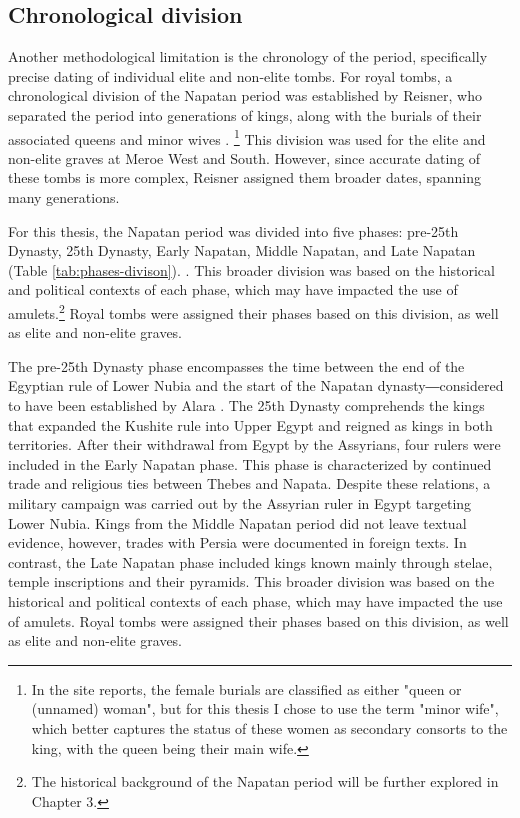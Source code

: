 \subsection{Chronological division}


Another methodological limitation is the chronology of the period, specifically precise dating of individual elite and non-elite tombs. For royal tombs, a chronological division of the Napatan period was established by Reisner, who separated the period into generations of kings, along with the burials of their associated queens and minor wives \parencites{dunhamElKurru1950, dunhamNuri1955}. \footnote{In the site reports, the female burials are classified as either "queen or (unnamed) woman", but for this thesis I chose to use the term "minor wife", which better captures the status of these women as secondary consorts to the king, with the queen being their main wife.} This division was used for the elite and non-elite graves at Meroe West and South. However, since accurate dating of these tombs is more complex, Reisner assigned them broader dates, spanning many generations.


For this thesis, the Napatan period was divided into five phases: pre-25th Dynasty, 25th Dynasty, Early Napatan, Middle Napatan, and Late Napatan (Table \ref{tab:phases-divison}). . This broader division was based on the historical and political contexts of each phase, which may have impacted the use of amulets.\footnote{The historical background of the Napatan period will be further explored in Chapter 3.} Royal tombs were assigned their phases based on this division, as well as elite and non-elite graves.


The pre-25th Dynasty phase encompasses the time between the end of the Egyptian rule of Lower Nubia and the start of the Napatan dynasty―considered to have been established by Alara \parencites[p.~314-318]{törökTwoWorldsFrontier2009}. The 25th Dynasty comprehends the kings that expanded the Kushite rule into Upper Egypt and reigned as kings in both territories. After their withdrawal from Egypt by the Assyrians, four rulers were included in the Early Napatan phase. This phase is characterized by continued trade and religious ties between Thebes and Napata. Despite these relations, a military campaign was carried out by the Assyrian ruler in Egypt targeting Lower Nubia. Kings from the Middle Napatan period did not leave textual evidence, however, trades with Persia were documented in foreign texts. In contrast, the Late Napatan phase included kings known mainly through stelae, temple inscriptions and their pyramids. This broader division was based on the historical and political contexts of each phase, which may have impacted the use of amulets. Royal tombs were assigned their phases based on this division, as well as elite and non-elite graves.


